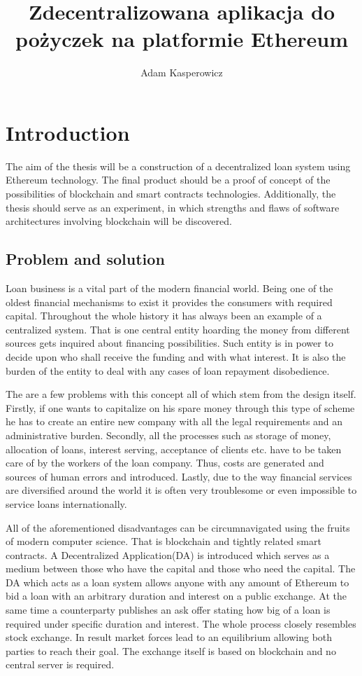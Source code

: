 \documentclass[a4paper,12pt,twoside,openany]{report}
\title{Zdecentralizowana aplikacja do pożyczek na platformie Ethereum}
\author{Adam Kasperowicz}
\begin{document}
\maketitle

\chapter{Introduction}
The aim of the thesis will be a construction of a decentralized loan system using Ethereum
technology. The final product should be a proof of concept of the possibilities of blockchain and smart contracts technologies. Additionally, the thesis should serve as an experiment, in which strengths and flaws of software architectures involving blockchain will be discovered.
 
\section{Problem and solution}
Loan business is a vital part of the modern financial world. Being one of the oldest financial mechanisms to exist it provides the consumers with required capital. Throughout the whole history it has always been an example of a centralized system. That is one central entity hoarding the money from different sources gets inquired about financing possibilities. Such entity is in power to decide upon who shall receive the funding and with what interest. It is also the burden of the entity to deal with any cases of loan repayment disobedience.

The are a few problems with this concept all of which stem from the design itself. Firstly, if one wants to capitalize on his spare money through this type of scheme he has to create an entire new company with all the legal requirements and an administrative burden. Secondly, all the processes such as storage of money, allocation of loans, interest serving, acceptance of clients etc. have to be taken care of by the workers of the loan company. Thus, costs are generated and sources of human errors and introduced. Lastly, due to the way financial services are diversified around the world it is often very troublesome or even impossible to service loans internationally.

All of the aforementioned disadvantages can be circumnavigated using the fruits of modern computer science. That is blockchain and tightly related smart contracts. A Decentralized Application(DA) is introduced which serves as a medium between those who have the capital and those who need the capital. The DA which acts as a loan system allows anyone with any amount of Ethereum to bid a loan with an arbitrary duration and interest on a public exchange. At the same time a counterparty publishes an ask offer stating how big of a loan is required under specific duration and interest. The whole process closely resembles stock exchange. In result market forces lead to an equilibrium allowing both parties to reach their goal. The exchange itself is based on blockchain and no central server is required.
\end{document}
